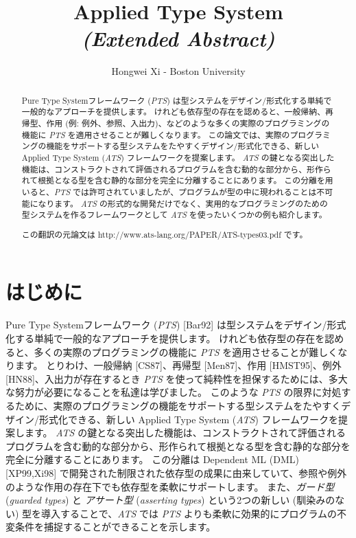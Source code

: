 \documentclass[submit,techreq,noauthor,onecolumn]{ipsj}
\begin{document}
\title{Applied Type System \\ {\huge\it (Extended Abstract)}}

\author{Hongwei Xi - Boston University}{}{}

\begin{abstract}
Pure Type Systemフレームワーク ({\it PTS}) は型システムをデザイン/形式化する単純で一般的なアプローチを提供します。
けれども依存型の存在を認めると、一般帰納、再帰型、作用 (例: 例外、参照、入出力)、などのような多くの実際のプログラミングの機能に {\it PTS} を適用させることが難しくなります。
この論文では、実際のプログラミングの機能をサポートする型システムをたやすくデザイン/形式化できる、新しい Applied Type System ({\it ATS}) フレームワークを提案します。
{\it ATS} の鍵となる突出した機能は、コンストラクトされて評価されるプログラムを含む動的な部分から、形作られて根拠となる型を含む静的な部分を完全に分離することにあります。
この分離を用いると、{\it PTS} では許可されていましたが、プログラムが型の中に現われることは不可能になります。
{\it ATS} の形式的な開発だけでなく、実用的なプログラミングのための型システムを作るフレームワークとして {\it ATS} を使ったいくつかの例も紹介します。

この翻訳の元論文は http://www.ats-lang.org/PAPER/ATS-types03.pdf です。
\end{abstract}

\maketitle
\thispagestyle{empty}

\section{はじめに}

Pure Type Systemフレームワーク ({\it PTS}) [Bar92] は型システムをデザイン/形式化する単純で一般的なアプローチを提供します。
けれども依存型の存在を認めると、多くの実際のプログラミングの機能に {\it PTS} を適用させることが難しくなります。
とりわけ、一般帰納 [CS87]、再帰型 [Men87]、作用 [HMST95]、例外 [HN88]、入出力が存在するとき {\it PTS} を使って純粋性を担保するためには、多大な努力が必要になることを私達は学びました。
このような {\it PTS} の限界に対処するために、実際のプログラミングの機能をサポートする型システムをたやすくデザイン/形式化できる、新しい Applied Type System ({\it ATS}) フレームワークを提案します。
{\it ATS} の鍵となる突出した機能は、コンストラクトされて評価されるプログラムを含む動的な部分から、形作られて根拠となる型を含む静的な部分を完全に分離することにあります。
この分離は Dependent ML (DML) [XP99,Xi98] で開発された制限された依存型の成果に由来していて、参照や例外のような作用の存在下でも依存型を柔軟にサポートします。
また、{\it ガード型} ({\it guarded types}) と {\it アサート型} ({\it asserting types}) という2つの新しい (馴染みのない) 型を導入することで、{\it ATS} では {\it PTS} よりも柔軟に効果的にプログラムの不変条件を捕捉することができることを示します。
\end{document}
